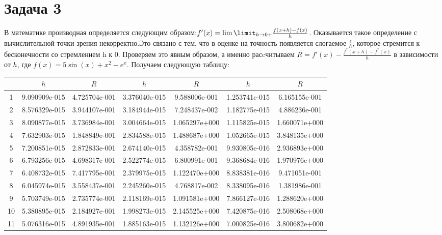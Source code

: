 \documentclass[a4paper,12pt]{article}
\begin{document}
  \section*{Задача 3}
  В математике производная определяется следующим образом:$ f'(x)=\lim\limit_{h\rightarrow 0+} \frac{f(x+h)-f(x)}{h}$. Оказывается такое определение с вычислительной точки зрения некорректно.\n  Это связано с тем, что в оценке на точность появляется слогаемое $\frac{\epsilon}{h}$, которое стремится к бесконечности со стремлением h к 0. Проверяем это явным образом, а именно расcчитываем $R=f'(x)-\frac{f^*(x+h)-f^*(x)}{h}$  в зависимости от  $h$, где $f(x)=5 \sin(x)+x^2-e^x$. Получаем следующую таблицу:
  \begin{table}[h]
    \begin{center}
      \begin{tabular}{|c|c|c|c|c|c|c|}
      \hline
      &$h$&$R$&$h$&$R$&$h$&$R$ \\
      \hline
      1&9.090909e-015&4.725704e-001&3.376040e-015&9.588006e-001&1.253741e-015&6.165155e-001\\
      \hline
      2&8.576329e-015&3.944107e-001&3.184944e-015&7.248437e-002&1.182775e-015&4.886236e-001\\
      \hline
      3&8.090877e-015&3.736984e-001&3.004664e-015&1.065297e+000&1.115825e-015&1.660071e+000\\
      \hline
      4&7.632903e-015&1.848849e-001&2.834588e-015&1.488687e+000&1.052665e-015&3.848135e+000\\
      \hline
      5&7.200851e-015&2.872833e-001&2.674140e-015&4.358782e-001&9.930805e-016&2.936893e+000\\
      \hline
      6&6.793256e-015&4.698317e-001&2.522774e-015&6.800991e-001&9.368684e-016&1.970976e+000\\
      \hline
      7&6.408732e-015&7.417795e-001&2.379975e-015&1.122470e+000&8.838381e-016&9.471051e-001\\
      \hline
      8&6.045974e-015&3.558437e-001&2.245260e-015&4.768817e-002&8.338095e-016&1.381986e-001\\
      \hline
      9&5.703749e-015&2.735774e-001&2.118169e-015&1.091581e+000&7.866127e-016&1.288620e+000\\
      \hline
      10&5.380895e-015&2.184927e-001&1.998273e-015&2.145525e+000&7.420875e-016&2.508068e+000\\
      \hline
      11&5.076316e-015&4.891935e-001&1.885163e-015&1.132126e+000&7.000825e-016&3.800682e+000\\
      \hline

\end{tabular}
\end{center}
\end{table}
\end{document}
